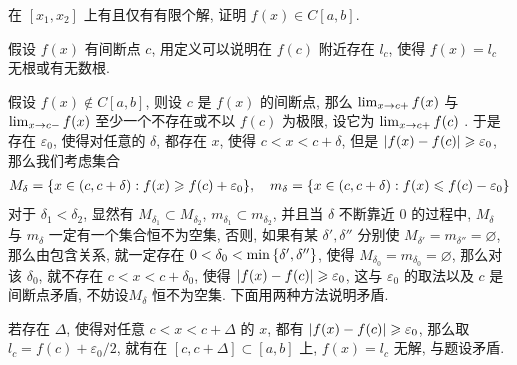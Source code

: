 \begin{exercise}[series=exer]
    在 $ [x_{1}, x_{2}] $ 上有且仅有有限个解, 证明 $ f(x) \in C[a, b] $.
    \begin{hint}
        假设 $ f(x) $ 有间断点 $ c $, 用定义可以说明在 $ f(c) $ 附近存在 $ l_{c} $, 使得 $ f(x) = l_{c} $ 无根或有无数根.
    \end{hint}
    \begin{answer}
        假设 $ f(x) \notin C[a, b] $, 则设 $ c $ 是 $ f(x) $ 的间断点, 那么 $ \lim_{x \to c+}f(x) $ 与 $ \lim_{x \to c-} f(x) $ 至少一个不存在或不以 $ f(c) $ 为极限, 设它为 $ \lim_{x \to c+}f(c) $ . 于是存在 $ \varepsilon_{0} $, 使得对任意的 $ \delta $, 都存在 $ x $, 使得 $ c < x < c + \delta $, 但是 $ \abs{f(x) - f(c)} \geqslant \varepsilon_{0} $, 那么我们考虑集合
        \begin{align*}
            M_{\delta} = \qty{x \in (c, c+\delta) : f(x) \geqslant f(c) + \varepsilon_{0}}, \quad m_{\delta} = \qty{x \in (c, c+\delta) : f(x) \leqslant f(c) - \varepsilon_{0}}
        \end{align*}
        对于 $ \delta_{1} < \delta_{2} $, 显然有 $ M_{\delta_{1}} \subset M_{\delta_{2}} $, $ m_{\delta_{1}} \subset m_{\delta_{2}} $, 并且当 $ \delta $ 不断靠近 $ 0 $ 的过程中, $ M_{\delta} $ 与 $ m_{\delta} $ 一定有一个集合恒不为空集, 否则, 如果有某 $ \delta', \delta'' $ 分别使 $ M_{\delta'} = m_{\delta''} = \varnothing $, 那么由包含关系, 就一定存在 $ 0 < \delta_{0} < \min\qty{\delta', \delta''} $, 使得 $ M_{\delta_{0}} = m_{\delta_{0}} = \varnothing $, 那么对该 $ \delta_{0} $, 就不存在 $ c < x < c + \delta_{0} $, 使得 $ \abs{f(x) - f(c)} \geqslant \varepsilon_{0} $, 这与 $ \varepsilon_{0} $ 的取法以及 $ c $ 是间断点矛盾, 不妨设$ M_{\delta} $ 恒不为空集. 下面用两种方法说明矛盾. 
        \begin{method}
            \item 若存在 $ \Delta $, 使得对任意 $ c < x < c + \Delta $ 的 $ x $, 都有 $ \abs{f(x) - f(c)} \geqslant \varepsilon_{0} $, 那么取 $ l_{c} = f(c) + \varepsilon_{0}/2 $, 就有在 $ [c, c + \Delta] \subset [a, b] $ 上, $ f(x) = l_{c} $ 无解, 与题设矛盾. 


\end{method}
\end{answer}
\end{exercise}
